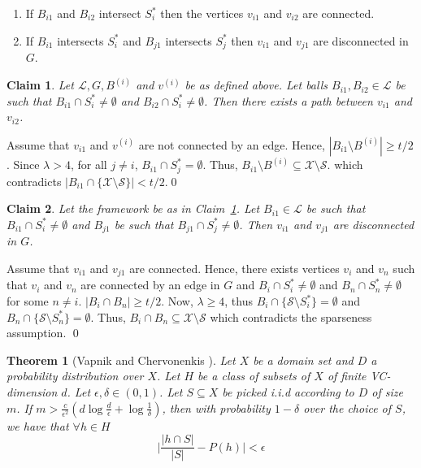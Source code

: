 \documentclass[letterpaper,12pt,titlepage,oneside,final]{book}
\newtheorem{theorem}{Theorem}
\newtheorem{smallLemma}{Claim}
\newcommand{\mc}{\mathcal}
\begin{document}
\begin{enumerate}[nolistsep,noitemsep,label=\textbf{F.\arabic*},leftmargin=0.3in]
\renewcommand\labelitemi{$\diamond$}
\item \label{fact:lambda1} If $B_{i1}$ and $B_{i2}$ intersect $S_i^*$ then the vertices $v_{i1}$ and $v_{i2}$ are connected.
\item \label{fact:lambda2} If $B_{i1}$ intersects $S_i^*$ and $B_{j1}$ intersects $S_j^*$ then $v_{i1}$ and $v_{j1}$ are disconnected in $G$.	
\end{enumerate}

\vspace{-0.1in}
\begin{smallLemma}
\label{claim:lambda1}
Let $\mc L, G, B^{(i)}$ and $v^{(i)}$ be as defined above. Let balls $B_{i1}, B_{i2} \in \mc L$ be such that $B_{i1} \cap S_i^* \neq \emptyset$ and $B_{i2} \cap S_i^* \neq \emptyset$. Then there exists a path between $v_{i1}$ and $v_{i2}$.
\end{smallLemma}
\vspace{-0.1in} Assume that $v_{i1}$ and $v^{(i)}$ are not connected by an edge. Hence, $|B_{i1} \setminus B^{(i)}| \ge t/2$. Since $\lambda > 4$, for all $j \neq i$, $B_{i1} \cap S_j^* = \emptyset$. Thus, $B_{i1} \setminus B^{(i)} \subseteq \mc X \setminus \mc S$. which contradicts $|B_{i1} \cap \{\mc X \setminus \mc S\}| < t/2$.\qed

\begin{smallLemma}
Let the framework be as in Claim~\ref{claim:lambda1}. Let $B_{i1} \in \mc L$ be such that $B_{i1} \cap S_i^* \neq \emptyset$ and $B_{j1}$ be such that $B_{j1} \cap S_j^* \neq \emptyset$. Then $v_{i1}$ and $v_{j1}$ are disconnected in $G$.
\end{smallLemma}
\vspace{-0.1in} Assume that $v_{i1}$ and $v_{j1}$ are connected. Hence, there exists vertices $v_{i}$ and $v_{n}$ such that $v_i$ and $v_n$ are connected by an edge in $G$ and $B_i \cap S_i^* \neq \emptyset$ and $B_n \cap S_n^* \neq \emptyset$ for some $n \neq i$. $|B_i \cap B_n| \ge t/2$. Now, $\lambda \ge 4$, thus $B_i \cap \{\mc S \setminus S_i^*\} = \emptyset$ and $B_n \cap \{\mc S\setminus S_n^*\} = \emptyset$. Thus, $B_i \cap B_n \subseteq \mc X \setminus \mc S$ which contradicts the sparseness assumption.
\qed

\label{appendix:sectiontr}
\begin{theorem}[Vapnik and Chervonenkis \cite{vapnik2015uniform}]\label{theorem:vceapprox}
Let $X$ be a domain set and $D$ a probability distribution over $X$. Let $H$ be a class of subsets of $X$ of finite VC-dimension $d$. Let $\epsilon, \delta \in (0,1)$. Let $S \subseteq X$ be picked i.i.d according to $D$ of size $m$. If $m > \frac{c}{\epsilon^2}(d\log \frac{d}{\epsilon}+\log\frac{1}{\delta})$, then  with probability $1-\delta$ over the choice of $S$, we have that $\forall h \in H$
$$\bigg|\frac{|h\cap S|}{|S|} - P(h)\bigg| < \epsilon$$
\end{theorem}
\end{document}
